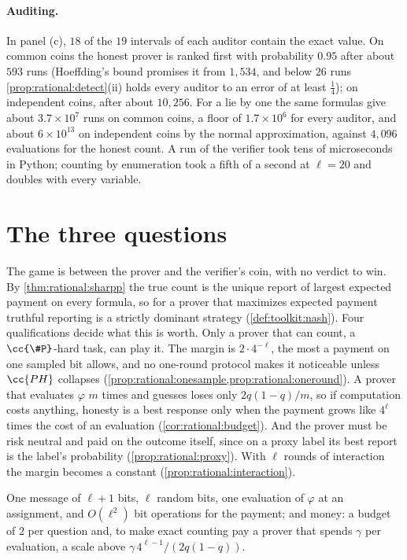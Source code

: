 \begin{refsection}
\paragraph{Auditing.} In panel (c), $18$ of the $19$ intervals of each auditor contain the exact value. On common coins the honest prover is ranked first with probability $0.95$ after about $593$ runs (Hoeffding's bound promises it from $1{,}534$, and below $26$ runs \cref{prop:rational:detect}(ii) holds every auditor to an error of at least $\frac14$); on independent coins, after about $10{,}256$. For a lie by one the same formulas give about $3.7\times10^7$ runs on common coins, a floor of $1.7\times10^6$ for every auditor, and about $6\times10^{13}$ on independent coins by the normal approximation, against $4{,}096$ evaluations for the honest count. A run of the verifier took tens of microseconds in Python; counting by enumeration took a fifth of a second at $\ell=20$ and doubles with every variable.

\section{The three questions}\label{sec:rational:questions}

\questionone The game is between the prover and the verifier's coin, with no verdict to win. By \cref{thm:rational:sharpp} the true count is the unique report of largest expected payment on every formula, so for a prover that maximizes expected payment truthful reporting is a strictly dominant strategy (\cref{def:toolkit:nash}). Four qualifications decide what this is worth. Only a prover that can count, a $\cc{\#P}$-hard task, can play it. The margin is $2\cdot4^{-\ell}$, the most a payment on one sampled bit allows, and no one-round protocol makes it noticeable unless $\cc{PH}$ collapses (\cref{prop:rational:onesample,prop:rational:oneround}). A prover that evaluates $\varphi$ $m$ times and guesses loses only $2q(1-q)/m$, so if computation costs anything, honesty is a best response only when the payment grows like $4^{\ell}$ times the cost of an evaluation (\cref{cor:rational:budget}). And the prover must be risk neutral and paid on the outcome itself, since on a proxy label its best report is the label's probability (\cref{prop:rational:proxy}). With $\ell$ rounds of interaction the margin becomes a constant (\cref{prop:rational:interaction}).

\questiontwo One message of $\ell+1$ bits, $\ell$ random bits, one evaluation of $\varphi$ at an assignment, and $O(\ell^2)$ bit operations for the payment; and money: a budget of $2$ per question and, to make exact counting pay a prover that spends $\gamma$ per evaluation, a scale above $\gamma\,4^{\ell-1}/(2q(1-q))$.


\end{refsection}
